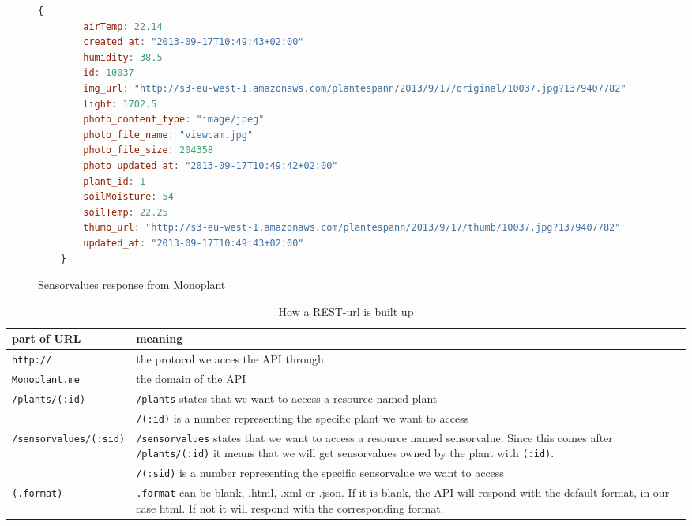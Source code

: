 \begin{figure}
    \begin{lstlisting}[language=javascript]
    {
        airTemp: 22.14
        created_at: "2013-09-17T10:49:43+02:00"
        humidity: 38.5
        id: 10037
        img_url: "http://s3-eu-west-1.amazonaws.com/plantespann/2013/9/17/original/10037.jpg?1379407782"
        light: 1702.5
        photo_content_type: "image/jpeg"
        photo_file_name: "viewcam.jpg"
        photo_file_size: 204358
        photo_updated_at: "2013-09-17T10:49:42+02:00"
        plant_id: 1
        soilMoisture: 54
        soilTemp: 22.25
        thumb_url: "http://s3-eu-west-1.amazonaws.com/plantespann/2013/9/17/thumb/10037.jpg?1379407782"
        updated_at: "2013-09-17T10:49:43+02:00"
    }
    \end{lstlisting}
    \caption{Sensorvalues response from Monoplant}
    \label{fig:sensorvaluesresponse}
\end{figure}



\bgroup
\def\arraystretch{1.8}	%
\begin{table}
	\centering
	\begin{tabular}{@{}lp{250pt}@{}} \toprule
		\textbf{part of URL}&	\textbf{meaning}\\ \midrule
		\texttt{http://}&	the protocol we acces the API through\\ 
		\texttt{Monoplant.me}&	the domain of the API\\ 
		\texttt{/plants/(:id)}&	\texttt{/plants} states that we want to access a resource named plant \\ &
		\texttt{/(:id)} is a number representing the specific plant we want to access\\ 
		\texttt{/sensorvalues/(:sid)}&	\texttt{/sensorvalues} states that we want to access a resource named sensorvalue. Since this comes after \texttt{/plants/(:id)} it means that we will get sensorvalues owned by the plant with \texttt{(:id)}. \\ &
		\texttt{/(:sid)} is a number representing the specific sensorvalue we want to access\\ 
		\texttt{(.format)}&	 \texttt{.format} can be blank, .html, .xml or .json. If it is blank, the API will respond with the default format, in our case html. If not it will respond with the corresponding format.\\ \bottomrule
	\end{tabular}
	\caption{How a REST-url is built up}
	\label{fig:RESTurl}
\end{table}
\egroup


